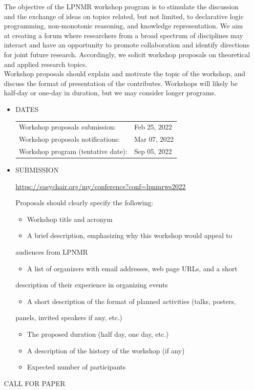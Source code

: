 \documentclass[prodmode,acmtecs]{acmsmall} %
\begin{document}
  The objective of the LPNMR workshop program is to stimulate the discussion and the exchange of ideas on topics related, but not limited, to declarative logic programming, non-monotonic reasoning, and knowledge representation. We aim at creating a forum where researchers from a broad spectrum of disciplines may interact and have an opportunity to promote collaboration and identify directions for joint future research. Accordingly, we solicit workshop proposals on theoretical and applied research topics.\\ 
  Workshop proposals should explain and motivate the topic of the workshop, and discuss the format of presentation of the contributes. Workshops will likely be half-day or one-day in duration, but we may consider longer programs. \\ 
\begin{itemize}\item  DATES 
 
\begin{tabulary}{\linewidth}{LL}Workshop proposals submission:  & Feb 25, 2022 \\
Workshop proposals notifications:  & Mar 07, 2022 \\
Workshop program (tentative date):  & Sep 05, 2022 \\
\end{tabulary}
 
\item  SUBMISSION 
 
  \href{https://easychair.org/my/conference?conf=lpnmrws2022}{https://easychair.org/my/conference?conf=lpnmrws2022} 
 
  Proposals should clearly specify the following: 
 
\begin{itemize}\item  Workshop title and acronym
\item  A brief description, emphasizing why this workshop would appeal to
\end{itemize} 
     audiences from LPNMR 
 
\begin{itemize}\item  A list of organizers with email addresses, web page URLs, and a short 
\end{itemize} 
     description of their experience in organizing events 
 
\begin{itemize}\item  A short description of the format of planned activities (talks, posters,
\end{itemize} 
     panels, invited speakers if any, etc.) 
 
\begin{itemize}\item  The proposed duration (half day, one day, etc.)
\item  A description of the history of the workshop (if any)
\item  Expected number of participants
\end{itemize} 
\end{itemize}CALL FOR PAPER 
\end{document}
